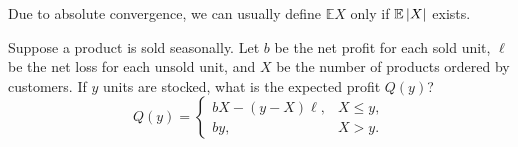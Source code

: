 \documentclass{huhtakm-template-book-v2}
\newcommand{\expect}{\mathbb{E}}
\begin{document}
    \begin{rem}
        Due to absolute convergence, we can usually define $\expect{X}$ only if $\expect\abs{X}$ exists.
    \end{rem}
    \begin{eg}
        Suppose a product is sold seasonally. Let $b$ be the net profit for each sold unit, $\ell$ be the net loss for each unsold unit, and $X$ be the number of products ordered by customers. If $y$ units are stocked, what is the expected profit $Q(y)$?
        \begin{equation*}
            Q(y) = \begin{cases}
                bX-(y-X)\ell, &X \leq y,\\
                by, &X > y.
            \end{cases}
        \end{equation*}
    \end{eg}
    \newpage
\end{document}
